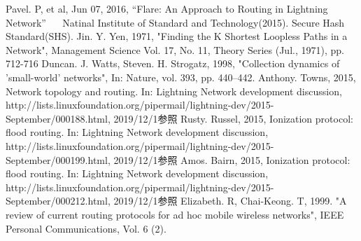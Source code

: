 \documentclass[12pt]{jarticle}
\begin{document}
\begin{thebibliography}{9}
   Pavel. P, et al, Jun 07, 2016, “Flare: An Approach to Routing in Lightning Network”
　 Natinal Institute of Standard and Technology(2015). Secure Hash Standard(SHS).
   Jin. Y. Yen, 1971, "Finding the K Shortest Loopless Paths in a Network", Management Science Vol. 17, No. 11, Theory Series (Jul., 1971), pp. 712-716
   Duncan. J. Watts, Steven. H. Strogatz, 1998, "Collection dynamics of 'small-world' networks", In: Nature, vol. 393, pp. 440–442.
   Anthony. Towns, 2015, Network topology and routing. In: Lightning Network development discussion, http://lists.linuxfoundation.org/pipermail/lightning-dev/2015-September/000188.html, 2019/12/1参照
  Rusty. Russel, 2015, Ionization protocol: flood routing. In: Lightning Network development discussion, http://lists.linuxfoundation.org/pipermail/lightning-dev/2015-September/000199.html, 2019/12/1参照
   Amos. Bairn, 2015, Ionization protocol: flood routing. In: Lightning Network development discussion, http://lists.linuxfoundation.org/pipermail/lightning-dev/2015-September/000212.html, 2019/12/1参照
   Elizabeth. R, Chai-Keong. T, 1999. "A review of current routing protocols for ad hoc mobile wireless
networks", IEEE Personal Communications, Vol. 6 (2).
\end{thebibliography}
\end{document}
